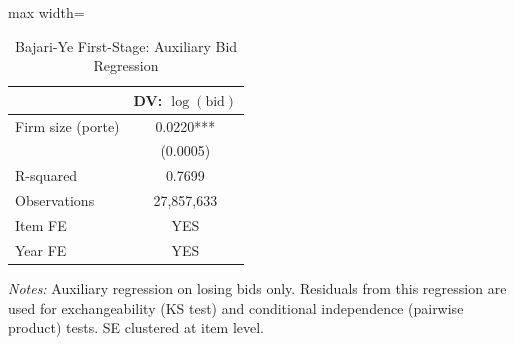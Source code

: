 \begin{table}[htbp]
\centering
\caption{Bajari-Ye First-Stage: Auxiliary Bid Regression}
\label{tab:bajari_ye_firststage}
\begin{adjustbox}{max width=\textwidth}
\begin{threeparttable}
\small
\begin{tabular}{lc}
\toprule
 & DV: $\log(\text{bid})$ \\
\midrule
Firm size (porte) & 0.0220*** \\
 & (0.0005) \\
\midrule
R-squared & 0.7699 \\
Observations & 27,857,633 \\
Item FE & YES \\
Year FE & YES \\
\bottomrule
\end{tabular}
\begin{tablenotes}
\small
\item \textit{Notes:} Auxiliary regression on losing bids only.
Residuals from this regression are used for exchangeability
(KS test) and conditional independence (pairwise product) tests.
SE clustered at item level.
\end{tablenotes}
\end{threeparttable}
\end{adjustbox}
\end{table}
